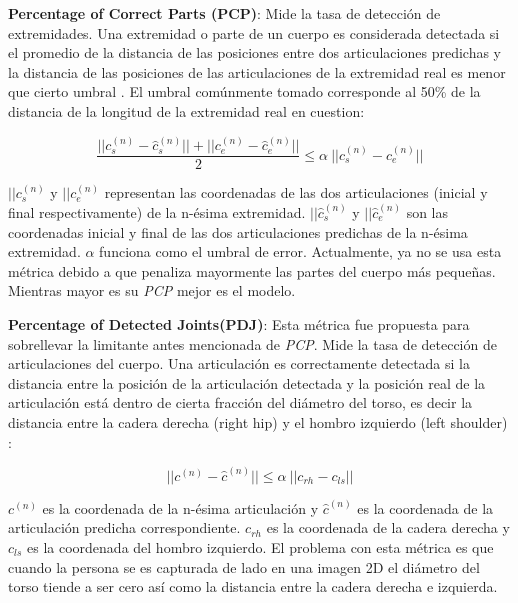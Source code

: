 \textbf{Percentage of Correct Parts (PCP)}: Mide la tasa de detección de extremidades. Una extremidad
o parte de un cuerpo es considerada detectada si el promedio de la distancia de las posiciones entre dos
articulaciones predichas y la distancia de las posiciones de las articulaciones de la extremidad real
es menor que cierto umbral \cite{4587468}. El umbral comúnmente tomado corresponde al 50\% de la distancia de la
longitud de la extremidad real en cuestion:

\begin{equation}
    \frac{||c_s^{(n)} - \hat{c}_s^{(n)}|| + ||c_e^{(n)} - \hat{c}_e^{(n)}||}{2} \le \alpha\ || c_s^{(n)} - c_e^{(n)} ||
    \label{eq:PCP}
\end{equation}

$||c_s^{(n)}$ y $||c_e^{(n)}$ representan las coordenadas de las dos articulaciones (inicial y final
respectivamente) de la n-ésima extremidad. $||\hat c_s^{(n)}$ y $||\hat c_e^{(n)}$ son las coordenadas
inicial y final de las dos articulaciones predichas de la n-ésima extremidad. $\alpha$ funciona como
el umbral de error. Actualmente, ya no se usa esta métrica debido a que penaliza mayormente las partes
del cuerpo más pequeñas. Mientras mayor es su \textit{PCP} mejor es el modelo.


\textbf{Percentage of Detected Joints(PDJ)}: Esta métrica fue propuesta para sobrellevar la
limitante antes mencionada de \textit{PCP}. Mide la tasa de detección de articulaciones del cuerpo.
Una articulación es correctamente detectada si la distancia entre la posición de la articulación
detectada y la posición real de la articulación está dentro de cierta fracción del diámetro del torso,
es decir la distancia entre la cadera derecha (right hip) y el hombro izquierdo (left shoulder)
\cite{6619315} \cite{DBLP:journals/corr/ToshevS13}:

\begin{equation}
    ||c^{(n)} - \hat{c}^{(n)}|| \le \alpha\ || c_{rh} - c_{ls} ||
    \label{eq:PDJ}
\end{equation}

$c^{(n)}$ es la coordenada de la n-ésima articulación y $\hat c^{(n)}$ es la coordenada de la
articulación predicha correspondiente. $c_{rh}$ es la coordenada de la cadera derecha y $c_{ls}$
es la coordenada del hombro izquierdo. El problema con esta métrica es que cuando la persona se es
capturada de lado en una imagen 2D el diámetro del torso tiende a ser cero así como la distancia
entre la cadera derecha e izquierda.

